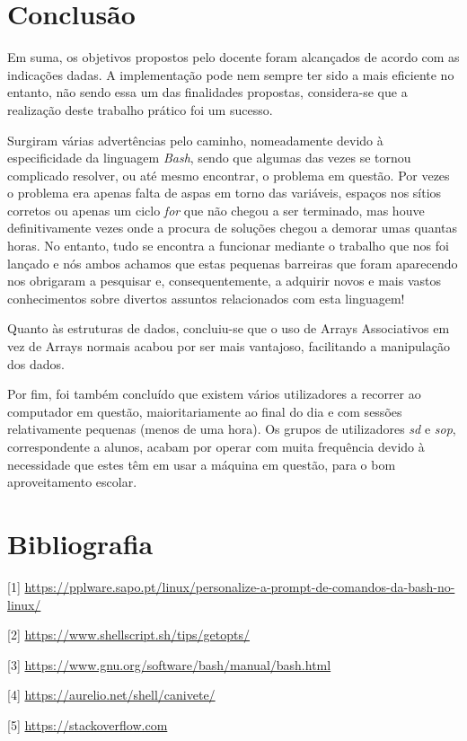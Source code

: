 \documentclass[10pt,portuguese]{article}
\begin{document}
\clearpage

\section{Conclusão}
\par Em suma, os objetivos propostos pelo docente foram alcançados de acordo com as indicações dadas. A implementação pode nem sempre ter sido a mais eficiente no entanto, não sendo essa um das finalidades propostas, considera-se que a realização deste trabalho prático foi um sucesso.
\par Surgiram várias advertências pelo caminho, nomeadamente devido à especificidade da linguagem \textit{Bash}, sendo que algumas das vezes se tornou complicado resolver, ou até mesmo encontrar, o problema em questão. Por vezes o problema era apenas falta de aspas em torno das variáveis, espaços nos sítios corretos ou apenas um ciclo \textit{for} que não chegou a ser terminado, mas houve definitivamente vezes onde a procura de soluções chegou a demorar umas quantas horas. No entanto, tudo se encontra a funcionar mediante o trabalho que nos foi lançado e nós ambos achamos que estas pequenas barreiras que foram aparecendo nos obrigaram a pesquisar e, consequentemente, a adquirir novos e mais vastos conhecimentos sobre divertos assuntos relacionados com esta linguagem!
\par Quanto às estruturas de dados, concluiu-se que o uso de Arrays Associativos em vez de Arrays normais acabou por ser mais vantajoso, facilitando a manipulação dos dados.
\par Por fim, foi também concluído que existem vários utilizadores a recorrer ao computador em questão, maioritariamente ao final do dia e com sessões relativamente pequenas (menos de uma hora). Os grupos de utilizadores \textit{sd} e \textit{sop}, correspondente a alunos, acabam por operar com muita frequência devido à necessidade que estes têm em usar a máquina em questão, para o bom aproveitamento escolar.


\clearpage

\section{Bibliografia}





\vspace{5mm} %

[1] \url{https://pplware.sapo.pt/linux/personalize-a-prompt-de-comandos-da-bash-no-linux/}

[2] \url{https://www.shellscript.sh/tips/getopts/}

[3] \url{https://www.gnu.org/software/bash/manual/bash.html}

[4] \url{https://aurelio.net/shell/canivete/}

[5] \url{https://stackoverflow.com}
\end{document}
